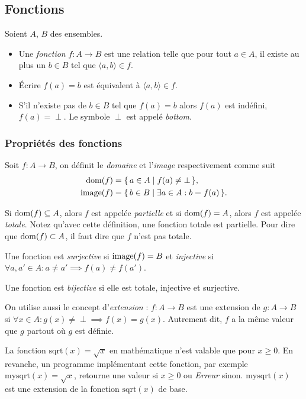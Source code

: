 
\subsection{Fonctions}
\label{subsec:fonctions}
Soient $A$, $B$ des ensembles.
\begin{itemize}
  	\item Une \emph{fonction} $f \colon A \rightarrow B$ est une relation telle que pour tout $a \in
	A$, il existe au plus un $b \in B$ tel que $\langle a,b \rangle \in f$.
	\item Écrire $f(a)=b$ est équivalent à $\langle a,b \rangle \in f$.
	\item S'il n'existe pas de $b \in B$ tel que $f(a)=b$ alors $f(a)$ est indéfini,
		$f(a) = \perp$. Le symbole $\perp$ est appelé \emph{bottom}.
\end{itemize}

\subsubsection{Propriétés des fonctions}
\label{par:proprietes_des_fonctions}
Soit $f\colon A \to B$, on définit le \emph{domaine} et l'\emph{image} respectivement comme suit
\begin{align*}
  \operatorname{dom}(f)   & = \{\, a \in A \mid f(a) \neq \bot \,\},\\
  \operatorname{image}(f) & = \{\, b \in B \mid \exists a \in A : b = f(a) \,\}.
\end{align*}

Si $\operatorname{dom}(f) \subseteq A$, alors $f$ est appelée \emph{partielle} et si $\operatorname{dom}(f) = A$, alors $f$ est appelée \emph{totale}.
Notez qu'avec cette définition, une fonction totale est partielle.
Pour dire que $\operatorname{dom}(f) \subset A$, il faut dire que $f$ n'est pas totale.

Une fonction est \emph{surjective} si $\operatorname{image}(f) = B$ et \emph{injective} si $\forall a,a' \in A : a \neq a' \implies f(a) \neq f(a')$.

Une fonction est \emph{bijective} si elle est totale, injective et surjective.

On utilise aussi le concept d'\emph{extension} :
$f \colon A \rightarrow B$ est une extension de $g \colon A \rightarrow B$ si $\forall x \in A : g(x)\neq \perp \implies f(x) = g(x)$.
Autrement dit, $f$ a la même valeur que $g$ partout où $g$ est définie.

La fonction $\mathrm{sqrt}(x) = \sqrt{x}$ en mathématique n'est valable que pour $x\geq0$. En revanche, un programme implémentant cette fonction, par exemple $\mathrm{mysqrt}(x) = \sqrt{x}$, retourne une valeur si $x\geq0$ ou \textit{Erreur} sinon. $\mathrm{mysqrt}(x)$ est une extension de la fonction $\mathrm{sqrt}(x)$ de base.

